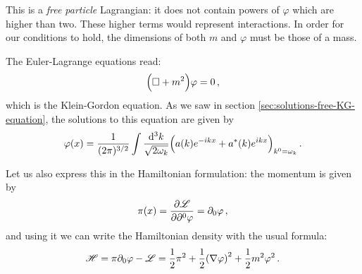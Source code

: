 \documentclass[main.tex]{subfiles}
\begin{document}
This is a \emph{free particle} Lagrangian: it does not contain powers of \(\varphi \) which are higher than two. These higher terms would represent interactions. 
In order for our conditions to hold, the dimensions of both \(m\) and \(\varphi \) must be those of a mass. 

The Euler-Lagrange equations read: 
%
\begin{align}
\qty(\square + m^2) \varphi = 0
\,,
\end{align}
%
which is the Klein-Gordon equation. 
As we saw in section \ref{sec:solutions-free-KG-equation}, the solutions to this equation are given by 
%
\begin{align}
\varphi (x) = 
\frac{1}{(2 \pi )^{3/2}} 
\int \frac{ \dd[3]{k}}{\sqrt{2 \omega_{k}}}
\qty(a(k) e^{-ikx} + a^{*}(k) e^{ikx})_{k^{0} = \omega_{k}}
\,.
\end{align}

Let us also express this in the Hamiltonian formulation: the momentum is given by 
%
\begin{align}
\pi (x) = \pdv{\mathscr{L}}{\partial^{0} \varphi } = \partial_{0} \varphi 
\,,
\end{align}
%
and using it we can write the Hamiltonian density with the usual formula: 
%
\begin{align}
\mathscr{H} = \pi \partial_{0} \varphi - \mathscr{L} = \frac{1}{2} \pi^2 + \frac{1}{2} \qty(\nabla \varphi )^2 + \frac{1}{2} m^2 \varphi^2
\,.
\end{align}
\end{document}

